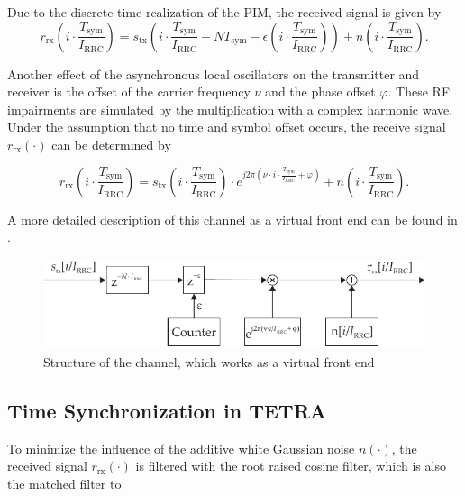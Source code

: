Due to the discrete time realization of the \ac{PIM}, the received signal is given by
\begin{equation}
r_\text{rx}\left( i \cdot \frac{T_\text{sym}}{I_\text{RRC}} \right) = s_\text{tx}\left(i \cdot \frac{T_\text{sym}}{I_\text{RRC}} -N T_\text{sym} - \epsilon\left( i \cdot \frac{T_\text{sym}}{I_\text{RRC}} \right) \right) + n\left( i \cdot \frac{T_\text{sym}}{I_\text{RRC}} \right).
\end{equation}

Another effect of the asynchronous local oscillators on the transmitter and receiver is the offset of the carrier frequency $\nu$ and the phase offset $\varphi$. These RF impairments are simulated by the multiplication with a complex harmonic wave. Under the assumption that no time and symbol offset occurs, the receive signal $r_\text{rx}(\cdot)$ can be determined by
 
\begin{equation}
r_\text{rx} \left( i \cdot \frac{T_\text{sym}}{I_\text{RRC}} \right) = s_\text{tx}\left(i \cdot \frac{T_\text{sym}}{I_\text{RRC}} \right)  \cdot e^{j2 \pi \left(\nu \cdot i \cdot \frac{T_\text{sym}}{I_\text{RRC}} +\varphi \right)} + n\left( i \cdot \frac{T_\text{sym}}{I_\text{RRC}} \right).
\end{equation}

A more detailed description of this channel as a virtual front end can be found in \cite{wnitl}.
 
\begin{figure}[htb]
	\centering
		\includegraphics{../kapitel04/figures/channel.pdf}
	\caption{Structure of the channel, which works as a virtual front end}
	\label{fig:channel}
\end{figure}

\subsection{Time Synchronization in TETRA}

To minimize the influence of the additive white Gaussian noise $n(\cdot)$, the received signal $r_\text{rx}(\cdot)$ is filtered with the root raised cosine filter, which is also the matched filter to

